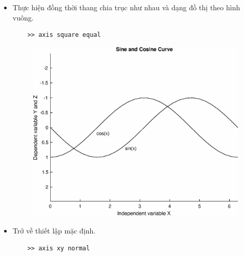 \documentclass[12pt,a4paper]{article}
\begin{document}
\begin{itemize}
\begin{center}
\begin{figure}[H]
\begin{center}
	\end{center}
		\caption{}
		\label{refdothi10}
	\end{figure}
\end{center}
	\item Thực hiện đồng thời thang chia trục như nhau và dạng đồ thị theo hình vuông.
\begin{lstlisting}
	>> axis square equal
\end{lstlisting}
\begin{center}
	\begin{figure}[H]
	\begin{center}
		\includegraphics[scale=0.6]{hinhtieuluan/dothi11}
	\end{center}
		\caption{}
		\label{refdothi11}
	\end{figure}
\end{center}
	\item Trở về thiết lập mặc định.
\begin{lstlisting}
	>> axis xy normal
\end{lstlisting}
\begin{center}
	\begin{figure}[H]
	\begin{center}

\end{center}
\end{figure}
\end{center}
\end{itemize}
\end{document}
